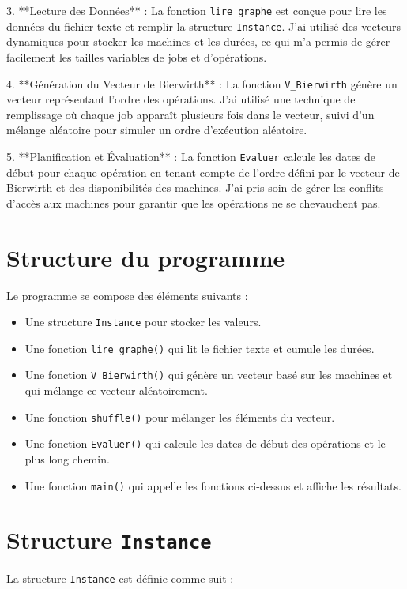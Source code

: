 \documentclass[a4paper,12pt]{article}
\begin{document}
3. **Lecture des Données** :
   La fonction \texttt{lire\_graphe} est conçue pour lire les données du fichier texte et remplir la structure \texttt{Instance}. J'ai utilisé des vecteurs dynamiques pour stocker les machines et les durées, ce qui m'a permis de gérer facilement les tailles variables de jobs et d'opérations.

4. **Génération du Vecteur de Bierwirth** :
   La fonction \texttt{V\_Bierwirth} génère un vecteur représentant l'ordre des opérations. J'ai utilisé une technique de remplissage où chaque job apparaît plusieurs fois dans le vecteur, suivi d'un mélange aléatoire pour simuler un ordre d'exécution aléatoire.

5. **Planification et Évaluation** :
   La fonction \texttt{Evaluer} calcule les dates de début pour chaque opération en tenant compte de l'ordre défini par le vecteur de Bierwirth et des disponibilités des machines. J'ai pris soin de gérer les conflits d'accès aux machines pour garantir que les opérations ne se chevauchent pas.

\section{Structure du programme}

Le programme se compose des éléments suivants :
\begin{itemize}
    \item Une structure \texttt{Instance} pour stocker les valeurs.
    \item Une fonction \texttt{lire\_graphe()} qui lit le fichier texte et cumule les durées.
    \item Une fonction \texttt{V\_Bierwirth()} qui génère un vecteur basé sur les machines et qui mélange ce vecteur aléatoirement.
    \item Une fonction \texttt{shuffle()} pour mélanger les éléments du vecteur.
    \item Une fonction \texttt{Evaluer()} qui calcule les dates de début des opérations et le plus long chemin.
    \item Une fonction \texttt{main()} qui appelle les fonctions ci-dessus et affiche les résultats.
\end{itemize}

\section{Structure \texttt{Instance}}

La structure \texttt{Instance} est définie comme suit :
\end{document}
